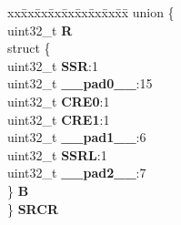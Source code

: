 \begin{DoxyCompactItemize}
\begin{tabbing}
\end{tabbing}\item 
\mbox{\label{structSIU__tag_a6cb3bb8ad5a61a120972a829c2144719}} 
\begin{tabbing}
xx\=xx\=xx\=xx\=xx\=xx\=xx\=xx\=xx\=\kill
union \{\\
\>uint32\_t {\bfseries R}\\
\>struct \{\\
\>\>uint32\_t {\bfseries SSR}:1\\
\>\>uint32\_t {\bfseries \_\_pad0\_\_}:15\\
\>\>uint32\_t {\bfseries CRE0}:1\\
\>\>uint32\_t {\bfseries CRE1}:1\\
\>\>uint32\_t {\bfseries \_\_pad1\_\_}:6\\
\>\>uint32\_t {\bfseries SSRL}:1\\
\>\>uint32\_t {\bfseries \_\_pad2\_\_}:7\\
\>\} {\bfseries B}\\
\} {\bfseries SRCR}\\


\end{tabbing}
\end{DoxyCompactItemize}
